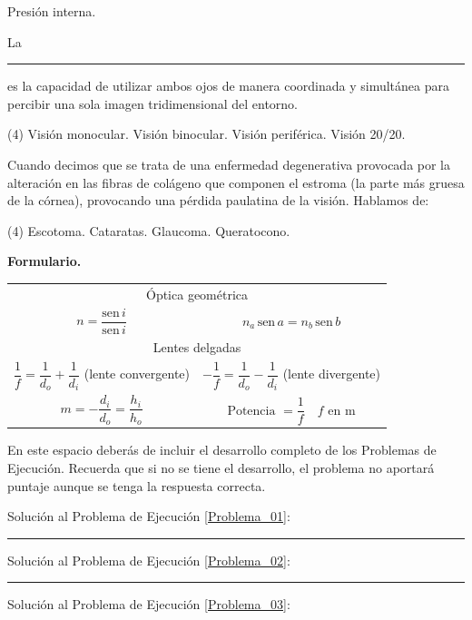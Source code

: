 \documentclass[12pt, letter]{exam}
\begin{document}
\begin{questions}
\begin{tasks}
        \task Presión interna.
    \end{tasks}
    \question  La \rule{2cm}{0.1mm} es la capacidad de utilizar ambos ojos de manera coordinada y simultánea para percibir una sola imagen tridimensional del entorno.
    \begin{tasks}(4)
        \task Visión monocular.
        \task Visión binocular.
        \task Visión periférica.
        \task Visión 20/20.
    \end{tasks}
    \question Cuando decimos que se trata de una enfermedad degenerativa provocada por la alteración en las fibras de colágeno que componen el estroma (la parte más gruesa de la córnea), provocando una pérdida paulatina de la visión. Hablamos de:
    \begin{tasks}(4)
        \task Escotoma.
        \task Cataratas.
        \task Glaucoma.
        \task Queratocono.
    \end{tasks}
\end{questions}

\newpage

\textbf{\huge{Formulario.}}
\begin{table}[H]
    \centering
    \setlength{\tabcolsep}{40pt}
    \renewcommand{\arraystretch}{2.5}
    \begin{tabular}{c  c}
        \multicolumn{2}{c}{Óptica geométrica} \\
        $n = \dfrac{\text{sen} \, i}{\text{sen} \, i}$ & $n_{a} \, \text{sen} \,  a = n_{b} \, \text{sen} \,  b$ \\ \hline
        \multicolumn{2}{c}{Lentes delgadas} \\
        $\dfrac{1}{f} = \dfrac{1}{d_{o}} + \dfrac{1}{d_{i}}$ (lente convergente) & $- \dfrac{1}{f} = \dfrac{1}{d_{o}} - \dfrac{1}{d_{i}}$ (lente divergente) \\
        $m = - \dfrac{d_{i}}{d_{o}} = \dfrac{h_{i}}{h_{o}}$ & $\text{Potencia } = \dfrac{1}{f} \quad f \text{ en } \unit{\meter}$ \\ \hline
\end{tabular}
\end{table}

En este espacio deberás de incluir el desarrollo completo de los Problemas de Ejecución. Recuerda que si no se tiene el desarrollo, el problema no aportará puntaje aunque se tenga la respuesta correcta.

\vspace*{0.5cm}
Solución al Problema de Ejecución \ref{Problema_01}:

\vspace*{4cm}
\rule{0.9\textwidth}{0.3mm}

Solución al Problema de Ejecución \ref{Problema_02}:

\vspace*{4.5cm}
\rule{0.9\textwidth}{0.3mm}

Solución al Problema de Ejecución \ref{Problema_03}:
\end{document}
